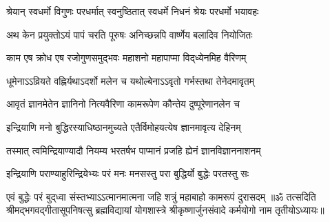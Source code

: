 \twolineshloka
{श्रेयान् स्वधर्मो विगुणः परधर्मात् स्वनुष्ठितात्}
{स्वधर्मे निधनं श्रेयः परधर्मो भयावहः}%

\twolineshloka
{अथ केन प्रयुक्तोऽयं पापं चरति पूरुषः}
{अनिच्छन्नपि वार्ष्णेय बलादिव नियोजितः}%

\twolineshloka
{काम एष क्रोध एष रजोगुणसमुद्भवः}
{महाशनो महापाप्मा विद्‌ध्येनमिह वैरिणम्}%

\twolineshloka
{धूमेनाऽऽव्रियते वह्निर्यथाऽदर्शो मलेन च}
{यथोल्बेनाऽऽवृतो गर्भस्तथा तेनेदमावृतम्}%

\twolineshloka
{आवृतं ज्ञानमेतेन ज्ञानिनो नित्यवैरिणा}
{कामरूपेण कौन्तेय दुष्पूरेणानलेन च}%

\twolineshloka
{इन्द्रियाणि मनो बुद्धिरस्याधिष्ठानमुच्यते}
{एतैर्विमोहयत्येष ज्ञानमावृत्य देहिनम्}%

\twolineshloka
{तस्मात् त्वमिन्द्रियाण्यादौ नियम्य भरतर्षभ}
{पाप्मानं प्रजहि ह्येनं ज्ञानविज्ञाननाशनम्}%

\twolineshloka
{इन्द्रियाणि पराण्याहुरिन्द्रियेभ्यः परं मनः}
{मनसस्तु परा बुद्धिर्यो बुद्धेः परतस्तु सः}%

\twolineshloka
{एवं बुद्धेः परं बुद्‍ध्वा संस्तभ्याऽऽत्मानमात्मना}
{जहि शत्रुं महाबाहो कामरूपं दुरासदम्}%
{॥ॐ तत्सदिति श्रीमद्भगवद्गीतासूपनिषत्सु ब्रह्मविद्यायां योगशास्त्रे श्रीकृष्णार्जुनसंवादे कर्मयोगो नाम तृतीयोऽध्यायः॥}